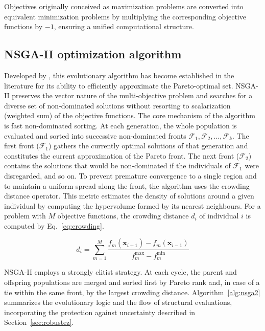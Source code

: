 Objectives originally conceived as maximization problems are converted into equivalent minimization problems by multiplying the corresponding objective functions by $-1$, ensuring a unified computational structure.

 \subsection{NSGA-II optimization algorithm} \label{sec:nsga2}

Developed by \textcite{DEB2009}, this evolutionary algorithm has become established in the literature for its ability to efficiently approximate the Pareto-optimal set.
NSGA-II preserves the vector nature of the multi-objective problem and searches for a diverse set of non-dominated solutions without resorting to scalarization (weighted sum) of the objective functions.
The core mechanism of the algorithm is fast non-dominated sorting.
At each generation, the whole population is evaluated and sorted into successive non-dominated fronts $\mathcal{F}_1, \mathcal{F}_2, \ldots, \mathcal{F}_k$.
The first front ($\mathcal{F}_1$) gathers the currently optimal solutions of that generation and constitutes the current approximation of the Pareto front.
The next front ($\mathcal{F}_2$) contains the solutions that would be non-dominated if the individuals of $\mathcal{F}_1$ were disregarded, and so on. To prevent premature convergence to a single region and to maintain a uniform spread along the front, the algorithm uses the crowding distance operator.
This metric estimates the density of solutions around a given individual by computing the hypervolume formed by its nearest neighbours.
For a problem with $M$ objective functions, the crowding distance $d_i$ of individual $i$ is computed by Eq.~\eqref{eq:crowding}.

 \begin{equation}d_i = \sum_{m=1}^{M} \frac{f_m(\mathbf{x}_{i+1}) - f_m(\mathbf{x}_{i-1})}{f_m^{\max} - f_m^{\min}}
 \label{eq:crowding}
 \end{equation}

NSGA-II employs a strongly elitist strategy.
At each cycle, the parent and offspring populations are merged and sorted first by Pareto rank and, in case of a tie within the same front, by the largest crowding distance.
Algorithm~\ref{alg:nsga2} summarizes the evolutionary logic and the flow of structural evaluations, incorporating the protection against uncertainty described in Section~\ref{sec:robustez}.

